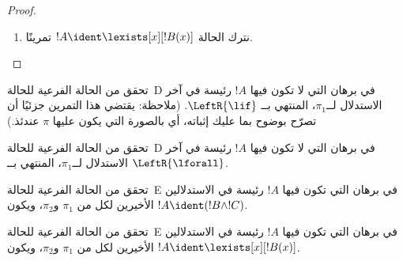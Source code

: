 \documentclass[../../../include/open-logic-section]{subfiles}
\begin{document}
\begin{proof}
\begin{enumerate}
المتتالية النهائية لــ!!{proof}~$\pi_1'$ هي $\Gamma \Sequent \Delta,
!B(c)$، حيث $c$ المتغير المميز لاستدلال~$\RightR{\lforall}$. ولذلك لا يرد
$c$ في~$!B(x)$ أو $\Gamma$ أو~$\Delta$. نفرض أن !!{proof}~$\pi$ منتظم،
ومن ثم لا يكون $c$ المتغير المميز إلا لاستدلال~$\RightR{\lforall}$ الآتي،
ولا يرد إلا فوقه، أي لا يرد إلا في~$\pi_1'$، وليس متغيرًا مميزًا لاستدلال
في~$\pi_1'$. ولما كان $c$ لا يرد في~$\pi_2$، فلا يجوز أن يرد في~$t$.
وبحسب  يكون
!!{proof}~$\Subst{\pi_1'}{t}{c}$ هو !!a{proof} لــ$\Gamma \Sequent
\Delta, !B(t)$. ونطبّق الآن فرض الاستقراء على !!{proof}
\[
\AxiomC{}
\RightLabel{$\Subst{\pi_1'}{t}{c}$}
\Deduce$\Gamma \fCenter \Delta, !B(t)$
\AxiomC{}
\RightLabel{$\pi_2''$}
\Deduce$!B(t), \Gamma \fCenter \Delta$
\RightLabel{\CutCS}
\BinaryInf$\Gamma \fCenter \Delta$
\DisplayProof
\]
(ينطبق فرض الاستقراء لأن !!{formula} القطع هي~$!B(t)$، ولذلك تكون رتبة
القطع في !!{proof} أدنى منها في~$\pi$.)
\item نترك الحالة $!A \ident \lexists[x][!B(x)]$ تمرينًا.
\end{enumerate}
\end{proof}

\begin{prob}
تحقق من الحالة الفرعية للحالة~D في برهان  التي لا
تكون فيها $!A$ رئيسة في آخر الاستدلال لــ$\pi_1$، المنتهي بــ
$\LeftR{\lif}$. (ملاحظة: يقتضي هذا التمرين جزئيًا أن تصرّح بوضوح بما عليك
إثباته، أي بالصورة التي يكون عليها $\pi$ عندئذ.)
\end{prob}

\begin{prob}
تحقق من الحالة الفرعية للحالة~D في برهان  التي لا
تكون فيها $!A$ رئيسة في آخر الاستدلال لــ$\pi_1$، المنتهي بــ
$\LeftR{\lforall}$.
\end{prob}

\begin{prob}
تحقق من الحالة الفرعية للحالة~E في برهان  التي تكون
فيها $!A$ رئيسة في الاستدلالين الأخيرين لكل من $\pi_1$ و$\pi_2$، ويكون
$!A \ident (!B \land !C)$.
\end{prob}

\begin{prob}
تحقق من الحالة الفرعية للحالة~E في برهان  التي تكون
فيها $!A$ رئيسة في الاستدلالين الأخيرين لكل من $\pi_1$ و$\pi_2$، ويكون
$!A \ident \lexists[x][!B(x)]$.
\end{prob}
\end{document}
